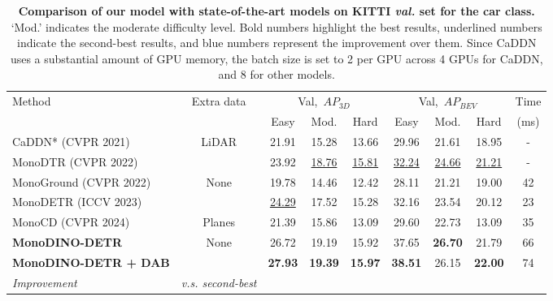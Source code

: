 \begin{table*}[h]
\caption[Comparison of our model with state-of-the-art models on KITTI \textit{val.}]{\textbf{Comparison of our model with state-of-the-art models on KITTI \textit{val.} set for the car class.} `Mod.' indicates the moderate difficulty level. Bold numbers highlight the best results, underlined numbers indicate the second-best results, and blue numbers represent the improvement over them. {\small *Since CaDDN uses a substantial amount of GPU memory, the batch size is set to 2 per GPU across 4 GPUs for CaDDN, and 8 for other models.}}
\centering
\small
\begin{tabular}{l|c|ccc|ccc|c}
	\toprule
\multirow{2}{*}{Method} & \multirow{2}{*}{Extra data} & \multicolumn{3}{c|}{Val,\ $AP_{3D}$} & \multicolumn{3}{c|}{Val,\ $AP_{BEV}$} & Time \\ 
& & Easy & Mod. & Hard & Easy & Mod. & Hard & (ms) \\
\midrule
CaDDN* (CVPR 2021) \cite{reading2021categorical} & \multirow{2}{*}{LiDAR} & 21.91 & 15.28 & 13.66 & 29.96 & 21.61 & 18.95  & - \\
MonoDTR (CVPR 2022) \cite{huang2022monodtr} &  & 23.92 & \underline{18.76} & \underline{15.81} & \underline{32.24} & \underline{24.66} & \underline{21.21}  & - \\
\midrule
MonoGround (CVPR 2022) \cite{qin2022monoground} & \multirow{2}{*}{None} & 19.78 & 14.46 & 12.42 & 28.11 & 21.21 & 19.00  & 42 \\
MonoDETR (ICCV 2023)\cite{zhang2023monodetr} &  & \underline{24.29} & 17.52 & 15.28 & 32.16 & 23.54 & 20.12 & 23 \\
\midrule
MonoCD (CVPR 2024) \cite{yan2024monocd} & Planes & 21.39 & 15.86 & 13.09 & 29.60 & 22.73  & 13.09 & 35 \\
\midrule
\textbf{MonoDINO-DETR} & \multirow{2}{*}{None} & 26.72 & 19.19 & 15.92 & 37.65 & \textbf{26.70} & 21.79 & 66 \\
\textbf{MonoDINO-DETR + DAB} &  & \textbf{27.93} & \textbf{19.39} & \textbf{15.97} & \textbf{38.51} & 26.15 & \textbf{22.00} & 74 \\
\textit{Improvement} & \textit{v.s. second-best} & \color{blue}{+3.64} & \color{blue}{+0.63} & \color{blue}{+0.16} & \color{blue}{+6.27} & \color{blue}{+1.49} & \color{blue}{+0.79} & \\
\bottomrule
\end{tabular}
\label{tab:KITTI_valid}
\end{table*}

